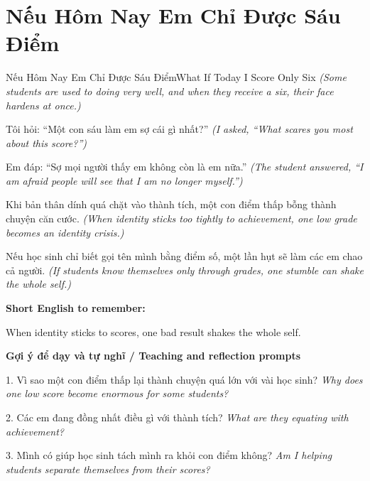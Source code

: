 \section{Nếu Hôm Nay Em Chỉ Được Sáu Điểm}
\begin{truyen}{Nếu Hôm Nay Em Chỉ Được Sáu Điểm}{What If Today I Score Only Six}
\textit{(Some students are used to doing very well, and when they receive a six, their face hardens at once.)}

Tôi hỏi: “Một con sáu làm em sợ cái gì nhất?”
\textit{(I asked, “What scares you most about this score?”)}

Em đáp: “Sợ mọi người thấy em không còn là em nữa.”
\textit{(The student answered, “I am afraid people will see that I am no longer myself.”)}

Khi bản thân dính quá chặt vào thành tích, một con điểm thấp bỗng thành chuyện căn cước.
\textit{(When identity sticks too tightly to achievement, one low grade becomes an identity crisis.)}

\end{truyen}

\begin{baihoc}
Nếu học sinh chỉ biết gọi tên mình bằng điểm số, một lần hụt sẽ làm các em chao cả người.
\textit{(If students know themselves only through grades, one stumble can shake the whole self.)}
\end{baihoc}

\begin{ghinhoanh}
\textbf{Short English to remember:}

When identity sticks to scores, one bad result shakes the whole self.

\end{ghinhoanh}

\begin{tuhocnhanh}
\textbf{Gợi ý để dạy và tự nghĩ / Teaching and reflection prompts}

1. Vì sao một con điểm thấp lại thành chuyện quá lớn với vài học sinh? \textit{Why does one low score become enormous for some students?}

2. Các em đang đồng nhất điều gì với thành tích? \textit{What are they equating with achievement?}

3. Mình có giúp học sinh tách mình ra khỏi con điểm không? \textit{Am I helping students separate themselves from their scores?}
\end{tuhocnhanh}
\ngancach

